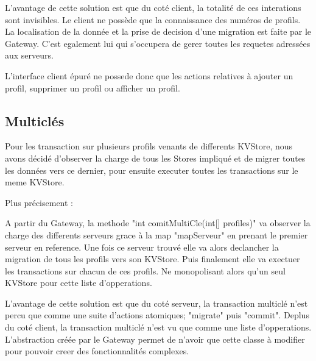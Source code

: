 L'avantage de cette solution est que du coté client, la totalité de ces interations sont invisibles. Le client ne possède que la connaissance des numéros de profils. La localisation de la donnée et la prise de decision d'une migration est faite par le Gateway. C'est egalement lui qui s'occupera de gerer toutes les requetes adressées aux serveurs.

L'interface client épuré ne possede donc que les actions relatives à ajouter un profil, supprimer un profil ou afficher un profil.

\subsection {Multiclés}

Pour les transaction sur plusieurs profils venants de differents KVStore, nous avons décidé d'observer la charge de tous les Stores impliqué et de migrer toutes les données vers ce dernier, pour ensuite executer toutes les transactions sur le meme KVStore.

Plus précisement :

A partir du Gateway, la methode "int comitMultiCle(int[] profiles)" va observer la charge des differents serveurs grace à la map "mapServeur" en prenant le premier serveur en reference. Une fois ce serveur trouvé elle va alors declancher la migration de tous les profils vers son KVStore. Puis finalement elle va exectuer les transactions sur chacun de ces profils. Ne monopolisant alors qu'un seul KVStore pour cette liste d'opperations.

L'avantage de cette solution est que du coté serveur, la transaction multiclé n'est percu que comme une suite d'actions atomiques; "migrate" puis "commit".
Deplus du coté client, la transaction multiclé n'est vu que comme une liste d'opperations. L'abstraction créée par le Gateway permet de n'avoir que cette classe à modifier pour pouvoir creer des fonctionnalités complexes.


